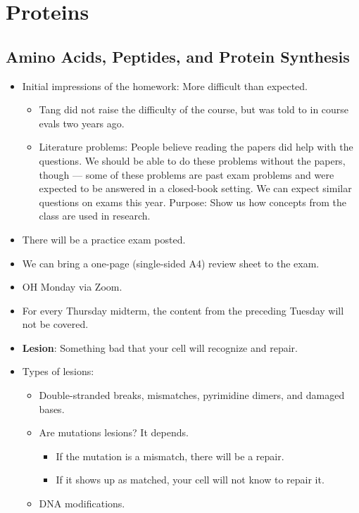 \documentclass[../notes.tex]{subfiles}
\begin{document}
\chapter{Proteins}
\section{Amino Acids, Peptides, and Protein Synthesis}
\begin{itemize}
    \item {}Initial impressions of the homework: More difficult than expected.
    \begin{itemize}
        \item Tang did not raise the difficulty of the course, but was told to in course evals two years ago.
        \item Literature problems: People believe reading the papers did help with the questions. We should be able to do these problems without the papers, though --- some of these problems are past exam problems and were expected to be answered in a closed-book setting. We can expect similar questions on exams this year. Purpose: Show us how concepts from the class are used in research.
    \end{itemize}
    \item There will be a practice exam posted.
    \item We can bring a one-page (single-sided A4) review sheet to the exam.
    \item OH Monday via Zoom.
    \item For every Thursday midterm, the content from the preceding Tuesday will not be covered.
    \item \textbf{Lesion}: Something bad that your cell will recognize and repair.
    \item Types of lesions:
    \begin{itemize}
        \item Double-stranded breaks, mismatches, pyrimidine dimers, and damaged bases.
        \item Are mutations lesions? It depends.
        \begin{itemize}
            \item If the mutation is a mismatch, there will be a repair.
            \item If it shows up as matched, your cell will not know to repair it.
        \end{itemize}
        \item DNA modifications.

\end{itemize}
\end{itemize}
\end{document}
